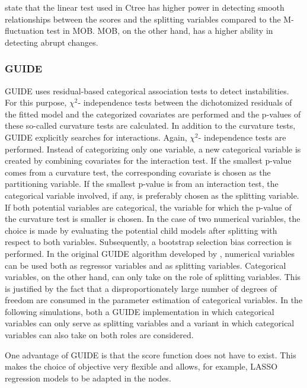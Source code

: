 \citep{Schlosser.2019} state that the linear test used in Ctree has higher power in detecting smooth relationships between the scores and the splitting variables compared to the M-fluctuation test in MOB. MOB, on the other hand, has a higher ability in detecting abrupt changes.


\subsubsection{GUIDE}
GUIDE \citep{.2002} uses residual-based categorical association tests to detect instabilities. For this purpose, $\chi^2$- independence tests between the dichotomized residuals of the fitted model and the categorized covariates are performed and the p-values of these so-called curvature tests are calculated. In addition to the curvature tests, GUIDE explicitly searches for interactions.  Again, $\chi^2$- independence tests are performed. Instead of categorizing only one variable, a new categorical variable is created by combining covariates for the interaction test. If the smallest p-value comes from a curvature test, the corresponding covariate is chosen as the partitioning variable. If the smallest p-value is from an interaction test, the categorical variable involved, if any, is preferably chosen as the splitting variable. If both potential variables are categorical, the variable for which the p-value of the curvature test is smaller is chosen. In the case of two numerical variables, the choice is made by evaluating the potential child models after splitting with respect to both variables.
Subsequently, a bootstrap selection bias correction is performed.
In the original GUIDE algorithm developed by \citep{.2002}, numerical variables can be used both as regressor variables and as splitting variables. Categorical variables, on the other hand, can only take on the role of splitting variables. This is justified by the fact that a disproportionately large number of degrees of freedom are consumed in the parameter estimation of categorical variables.
In the following simulations, both a GUIDE implementation in which categorical variables can only serve as splitting variables and a variant in which categorical variables can also take on both roles are considered. 

One advantage of GUIDE is that the score function does not have to exist. This makes the choice of objective very flexible and allows, for example, LASSO regression models to be adapted in the nodes.





